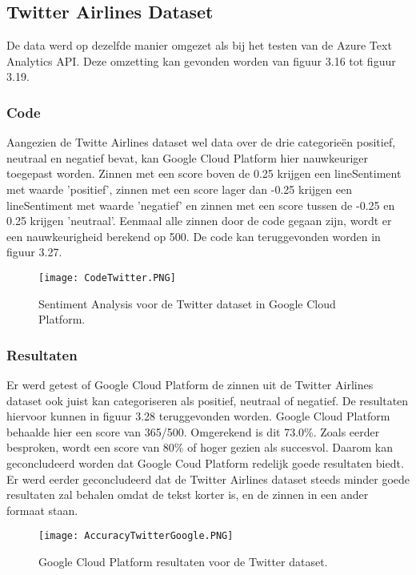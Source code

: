 \subsection{Twitter Airlines Dataset}
\label{twittergoogleplatform}

De data werd op dezelfde manier omgezet als bij het testen van de Azure Text Analytics API. Deze omzetting kan gevonden worden van figuur 3.16 tot figuur 3.19.

\subsubsection{Code}
\label{twittercodegoogleplatform}
Aangezien de Twitte Airlines dataset wel data over de drie categorieën positief, neutraal en negatief bevat, kan Google Cloud Platform hier nauwkeuriger toegepast worden. Zinnen met een score boven de 0.25 krijgen een lineSentiment met waarde 'positief', zinnen met een score lager dan -0.25 krijgen een lineSentiment met waarde 'negatief' en zinnen met een score tussen de -0.25 en 0.25 krijgen 'neutraal'. Eenmaal alle zinnen door de code gegaan zijn, wordt er een nauwkeurigheid berekend op 500. De code kan teruggevonden worden in figuur 3.27.

\begin{figure}[!htbp]
    \texttt{[image: CodeTwitter.PNG]}
    \caption{\label{codetwitter}Sentiment Analysis voor de Twitter dataset in Google Cloud Platform.}
\end{figure}
\FloatBarrier 

\subsubsection{Resultaten}
\label{twitterresultatengoogleplatform}
Er werd getest of Google Cloud Platform de zinnen uit de Twitter Airlines dataset ook juist kan categoriseren als positief, neutraal of negatief. De resultaten hiervoor kunnen in figuur 3.28 teruggevonden worden. Google Cloud Platform behaalde hier een score van 365/500. Omgerekend is dit 73.0\%. Zoals eerder besproken, wordt een score van 80\% of hoger gezien als succesvol. Daarom kan geconcludeerd worden dat Google Coud Platform redelijk goede resultaten biedt. Er werd eerder geconcludeerd dat de Twitter Airlines dataset steeds minder goede resultaten zal behalen omdat de tekst korter is, en de zinnen in een ander formaat staan. 

\begin{figure}[!htbp]
    \texttt{[image: AccuracyTwitterGoogle.PNG]}
    \caption{\label{accuracytwitter}Google Cloud Platform resultaten voor de Twitter dataset.}
\end{figure}
\FloatBarrier 

